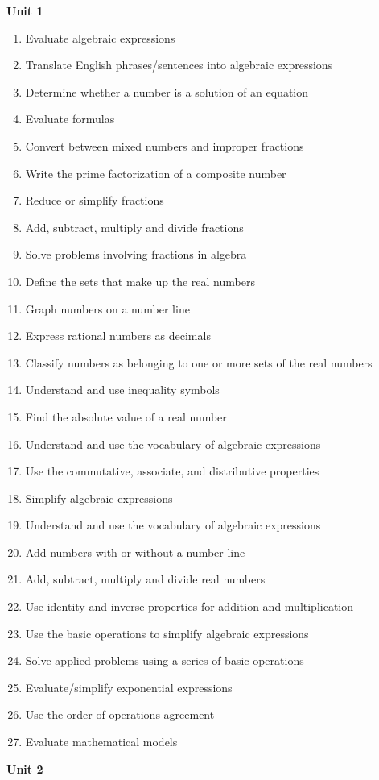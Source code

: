 \documentclass[10pt]{article}
\newenvironment{alphalist}{
\begin{enumerate}[label=(\arabic*),widest=107 ,leftmargin=25pt, itemsep=0pt]}
{\end{enumerate}}
\begin{document}
\noindent \textbf{Unit 1}
\begin{alphalist}
    \item Evaluate algebraic expressions
    \item Translate English phrases/sentences into algebraic expressions
    \item Determine whether a number is a solution of an equation
    \item Evaluate formulas
    \item Convert between mixed numbers and improper fractions
    \item Write the prime factorization of a composite number
    \item Reduce or simplify fractions
    \item Add, subtract, multiply and divide fractions
    \item Solve problems involving fractions in algebra
    \item Define the sets that make up the real numbers
    \item Graph numbers on a number line
    \item Express rational numbers as decimals
    \item Classify numbers as belonging to one or more sets of the real numbers
    \item Understand and use inequality symbols
    \item Find the absolute value of a real number
    \item Understand and use the vocabulary of algebraic expressions
    \item Use the commutative, associate, and distributive properties
    \item Simplify algebraic expressions
    \item Understand and use the vocabulary of algebraic expressions
    \item Add numbers with or without a number line
    \item Add, subtract, multiply and divide real numbers
    \item Use identity and inverse properties for addition and multiplication 
    \item Use the basic operations to simplify algebraic expressions 
    \item Solve applied problems using a series of basic operations
    \item Evaluate/simplify exponential expressions
    \item Use the order of operations agreement
    \item Evaluate mathematical models
\end{alphalist}
\noindent \textbf{Unit 2}
 
\end{document}
